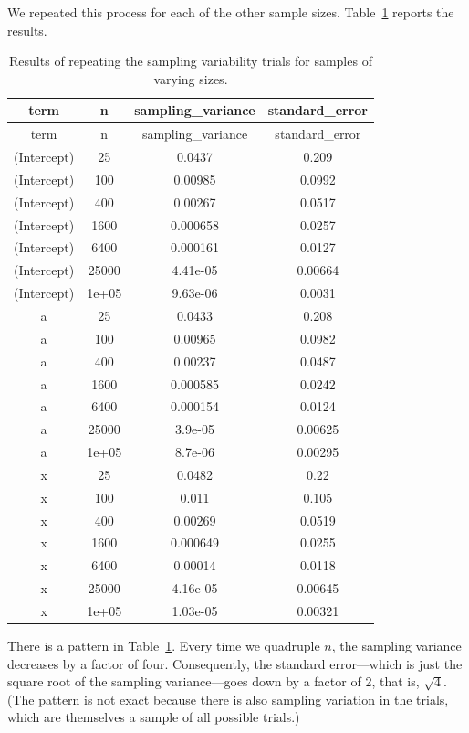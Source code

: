 \documentclass[
  letterpaper,
  DIV=11,
  numbers=noendperiod,
  oneside]{scrartcl}
\begin{document}
We repeated this process for each of the other sample sizes.
Table~\ref{tbl-se-sizes} reports the results.

\begin{longtable}[]{@{}cccc@{}}
\caption{Results of repeating the sampling variability trials for
samples of varying sizes.}\label{tbl-se-sizes}\tabularnewline
\toprule\noalign{}
term & n & sampling\_variance & standard\_error \\
\midrule\noalign{}
\endfirsthead
\toprule\noalign{}
term & n & sampling\_variance & standard\_error \\
\midrule\noalign{}
\endhead
\bottomrule\noalign{}
\endlastfoot
(Intercept) & 25 & 0.0437 & 0.209 \\
(Intercept) & 100 & 0.00985 & 0.0992 \\
(Intercept) & 400 & 0.00267 & 0.0517 \\
(Intercept) & 1600 & 0.000658 & 0.0257 \\
(Intercept) & 6400 & 0.000161 & 0.0127 \\
(Intercept) & 25000 & 4.41e-05 & 0.00664 \\
(Intercept) & 1e+05 & 9.63e-06 & 0.0031 \\
a & 25 & 0.0433 & 0.208 \\
a & 100 & 0.00965 & 0.0982 \\
a & 400 & 0.00237 & 0.0487 \\
a & 1600 & 0.000585 & 0.0242 \\
a & 6400 & 0.000154 & 0.0124 \\
a & 25000 & 3.9e-05 & 0.00625 \\
a & 1e+05 & 8.7e-06 & 0.00295 \\
x & 25 & 0.0482 & 0.22 \\
x & 100 & 0.011 & 0.105 \\
x & 400 & 0.00269 & 0.0519 \\
x & 1600 & 0.000649 & 0.0255 \\
x & 6400 & 0.00014 & 0.0118 \\
x & 25000 & 4.16e-05 & 0.00645 \\
x & 1e+05 & 1.03e-05 & 0.00321 \\
\end{longtable}

There is a pattern in Table~\ref{tbl-se-sizes}. Every time we quadruple
\(n\), the sampling variance decreases by a factor of four.
Consequently, the standard error---which is just the square root of the
sampling variance---goes down by a factor of 2, that is, \(\sqrt{4}\).
(The pattern is not exact because there is also sampling variation in
the trials, which are themselves a sample of all possible trials.)
\end{document}
